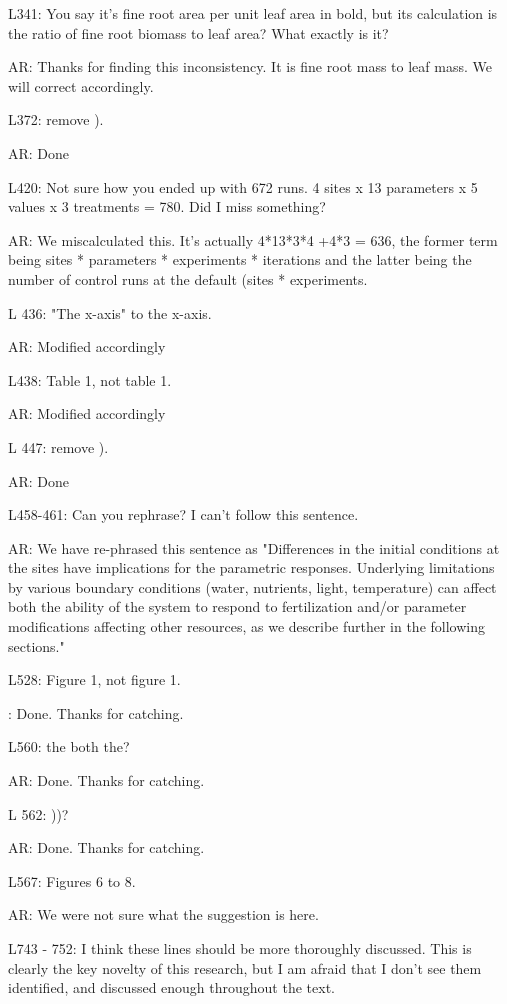 \documentclass{article}
\begin{document}
L341: You say it's fine root area per unit leaf area in bold, but its calculation is the ratio of fine root biomass to leaf area? What exactly is it?

\textsf{AR: Thanks for finding this inconsistency. It is fine root mass to leaf mass. We will correct accordingly}. 

L372: remove ). 

\textsf{AR: Done}

L420: Not sure how you ended up with 672 runs. 4 sites x 13 parameters x 5 values x 3 treatments = 780. Did I miss something? 

\textsf{AR: We miscalculated this. It's actually 4*13*3*4 +4*3 = 636, the former term being sites * parameters * experiments * iterations and the latter being the number of control runs at the default (sites * experiments.}

L 436: "The x-axis" to the x-axis. 

\textsf{AR: Modified accordingly}

L438: Table 1, not table 1. 

\textsf{AR: Modified accordingly}

L 447: remove ).

\textsf{AR: Done}

L458-461: Can you rephrase? I can't follow this sentence. 

\textsf{AR: We have re-phrased this sentence as "Differences in the initial conditions at the sites have implications for the parametric responses. Underlying limitations by various boundary conditions (water, nutrients, light, temperature) can affect both the ability of the system to respond to fertilization and/or parameter modifications affecting other resources, as we describe further in the following sections."}

L528: Figure 1, not figure 1. 

\textsf{: Done. Thanks for catching. }

L560: the both the? 

\textsf{AR: Done. Thanks for catching.} 
 
L 562: ))? 

\textsf{AR: Done. Thanks for catching.} 

L567: Figures 6 to 8. 

\textsf{AR: We were not sure what the suggestion is here. }

L743 - 752: I think these lines should be more thoroughly discussed. This is clearly the key novelty of this research, but I am afraid that I don't see them identified, and discussed enough throughout the text. 
\end{document}
